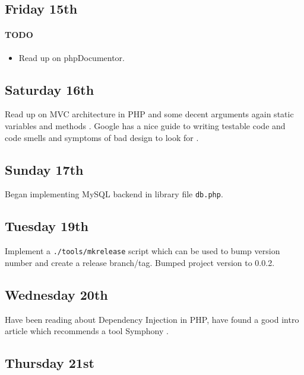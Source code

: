 \subsection{Friday 15th}
\paragraph{TODO}
\begin{itemize}
\item Read up on phpDocumentor.
\end{itemize}

\subsection{Saturday 16th}
Read up on MVC architecture in PHP \cite{Butler2010} and some decent arguments
again static variables and methods \cite{Butler2012}. Google has a nice guide to
writing testable code and code smells and symptoms of bad design to look for
\cite{Hevery2008}.

\subsection{Sunday 17th}
Began implementing MySQL backend in library file \texttt{db.php}.

\subsection{Tuesday 19th}
Implement a \texttt{./tools/mkrelease} script which can be used to bump version
number and create a release branch/tag. Bumped project version to 0.0.2.

\subsection{Wednesday 20th}
Have been reading about Dependency Injection in PHP, have found a good intro
article \cite{Rodrigue2012} which recommends a tool Symphony
\cite{SensioLabsND}.

\subsection{Thursday 21st}
